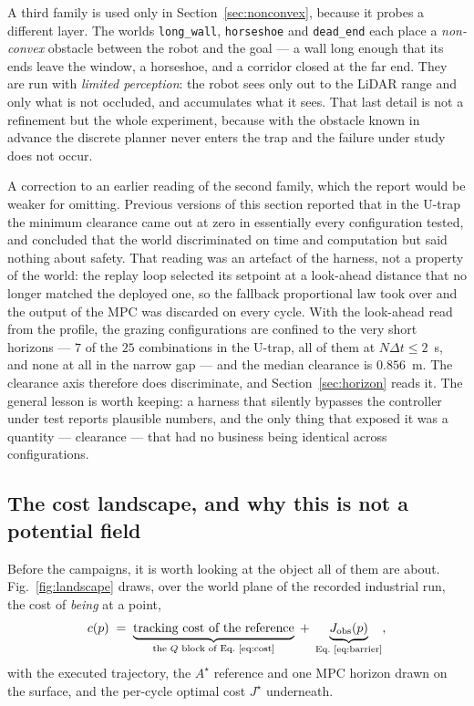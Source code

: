 \documentclass[11pt,a4paper]{article}
\newcommand{\astar}{$A^\star$}
\newcommand{\Jobs}{J_{\mathrm{obs}}}
\begin{document}
A third family is used only in Section~\ref{sec:nonconvex}, because it probes a different layer. The worlds
\texttt{long\_wall}, \texttt{horseshoe} and \texttt{dead\_end} each place a \emph{non-convex} obstacle
between the robot and the goal --- a wall long enough that its ends leave the window, a horseshoe, and a
corridor closed at the far end. They are run with \emph{limited perception}: the robot sees only out to the
LiDAR range and only what is not occluded, and accumulates what it sees. That last detail is not a refinement
but the whole experiment, because with the obstacle known in advance the discrete planner never enters the
trap and the failure under study does not occur.

A correction to an earlier reading of the second family, which the report would be weaker for omitting.
Previous versions of this section reported that in the U-trap the minimum clearance came out at zero in
essentially every configuration tested, and concluded that the world discriminated on time and computation
but said nothing about safety. That reading was an artefact of the harness, not a property of the world: the
replay loop selected its setpoint at a look-ahead distance that no longer matched the deployed one, so the
fallback proportional law took over and the output of the MPC was discarded on every cycle. With the
look-ahead read from the profile, the grazing configurations are confined to the very short horizons ---
$7$ of the $25$ combinations in the U-trap, all of them at $N\Delta t\le 2$~s, and none at all in the narrow
gap --- and the median clearance is $0.856$~m. The clearance axis therefore does discriminate, and
Section~\ref{sec:horizon} reads it. The general lesson is worth keeping: a harness that silently bypasses the
controller under test reports plausible numbers, and the only thing that exposed it was a quantity ---
clearance --- that had no business being identical across configurations.

\subsection{The cost landscape, and why this is not a potential field}
\label{sec:landscape}

Before the campaigns, it is worth looking at the object all of them are about. Fig.~\ref{fig:landscape}
draws, over the world plane of the recorded industrial run, the cost of \emph{being} at a point,
\begin{equation}
  c(p) \;=\; \underbrace{\text{tracking cost of the reference}}_{\text{the }Q\text{ block of Eq.~\eqref{eq:cost}}}
        \;+\; \underbrace{\Jobs(p)}_{\text{Eq.~\eqref{eq:barrier}}},
  \label{eq:landscape}
\end{equation}
with the executed trajectory, the \astar{} reference and one MPC horizon drawn on the surface, and the
per-cycle optimal cost $J^\star$ underneath.
\end{document}
